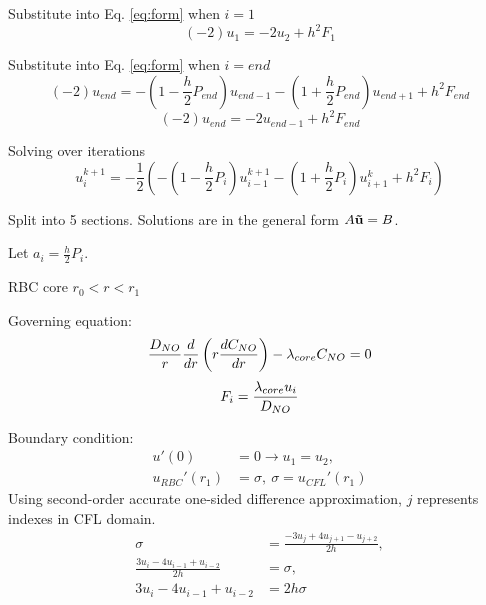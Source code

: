 \documentclass[8pt, a4paper]{article}
\begin{document}
  Substitute into Eq. \eqref{eq:form} when $i=1$
  \begin{equation}
  (-2)u_1=-2u_2+h^2F_1
  \end{equation}
  
  Substitute into Eq. \eqref{eq:form} when $i=end$
  \begin{equation}
  (-2)u_{end}=-\left (1-\frac{h}{2}P_{end} \right)u_{end-1}-\left 
  (1+\frac{h}{2}P_{end} \right)u_{end+1}+h^2F_{end}
  \end{equation}
  \begin{equation}
  (-2)u_{end}=-2u_{end-1}+h^2F_{end}
  \end{equation}
  
  Solving over iterations
  \begin{equation}
  u_i^{k+1} = -\frac{1}{2}\left(-\left (1-\frac{h}{2}P_i 
  \right)u_{i-1}^{k+1}-\left (1+\frac{h}{2}P_i \right)u_{i+1}^k+h^2F_i \right)
  \end{equation}

  Split into 5 sections. Solutions are in the general form $A\mathbf{\vec{u}}=B$.
  
  Let  $a_i=\frac{h}{2}P_i$.

  RBC core $r_0 < r < r_1$
  
  Governing equation:
  \begin{equation*}
  \frac{D_{NO}}{r}\frac{d}{dr}\left(r\frac{dC_{NO}}{dr}\right)-\lambda_{core}C_{NO}=0
  \end{equation*}
  \begin{equation*}
  F_i = \frac{\lambda_{core}u_i}{D_{NO}}
  \end{equation*}
  
  Boundary condition:
  \begin{align*}
  u'(0)&=0\rightarrow u_1 = u_2,\\
  u_{RBC}'(r_1)&=\sigma,\:\sigma=u_{CFL}'(r_1)
  \end{align*}
  Using second-order accurate one-sided difference approximation, $j$ 
  represents indexes in CFL domain.
  \begin{align*}
  \sigma&=\frac{-3u_j+4u_{j+1}-u_{j+2}}{2h},\\
  \frac{3u_i-4u_{i-1}+u_{i-2}}{2h}&=\sigma,\\
  3u_i-4u_{i-1}+u_{i-2}&=2h\sigma
  \end{align*}
  
\end{document}
